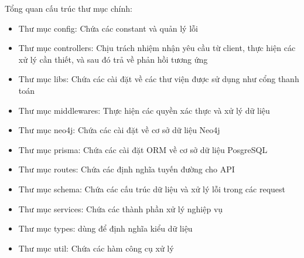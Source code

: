 Tổng quan cấu trúc thư mục chính:
\begin{itemize}
    \item Thư mục config: Chứa các constant và quản lý lỗi
    \item Thư mục controllers: Chịu trách nhiệm nhận yêu cầu từ client, thực hiện các xử lý cần thiết, và sau đó trả về phản hồi tương ứng
    \item Thư mục libs: Chứa các cài đặt về các thư viện được sử dụng như cổng thanh toán
    \item Thư mục middlewares: Thực hiện các quyền xác thực và xử lý dữ liệu
    \item Thư mục neo4j: Chứa các cài đặt về cơ sở dữ liệu Neo4j
    \item Thư mục prisma: Chứa các cài đặt ORM về cơ sở dữ liệu PosgreSQL
    \item Thư mục routes: Chứa các định nghĩa tuyến đường cho API
    \item Thư mục schema: Chứa các cấu trúc dữ liệu và xử lý lỗi trong các request
    \item Thư mục services: Chứa các thành phần xử lý nghiệp vụ
    \item Thư mục types: dùng để định nghĩa kiểu dữ liệu
    \item Thư mục util: Chứa các hàm công cụ xử lý
\end{itemize}
